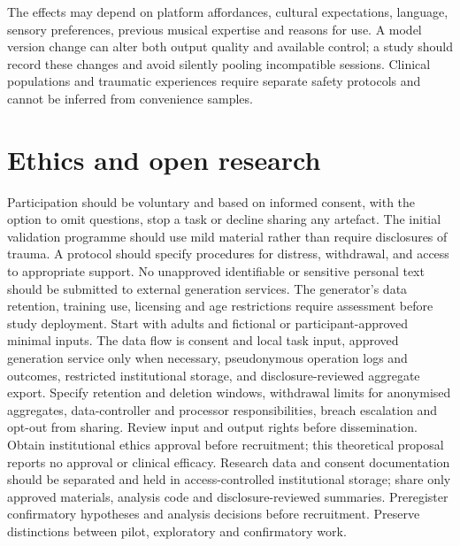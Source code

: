 \documentclass[11pt,a4paper]{article}
\begin{document}
The effects may depend on platform affordances, cultural expectations, language, sensory preferences, previous musical expertise and reasons for use. A model version change can alter both output quality and available control; a study should record these changes and avoid silently pooling incompatible sessions. Clinical populations and traumatic experiences require separate safety protocols and cannot be inferred from convenience samples.

\section{Ethics and open research}
Participation should be voluntary and based on informed consent, with the option to omit questions, stop a task or decline sharing any artefact. The initial validation programme should use mild material rather than require disclosures of trauma. A protocol should specify procedures for distress, withdrawal, and access to appropriate support. No unapproved identifiable or sensitive personal text should be submitted to external generation services. The generator's data retention, training use, licensing and age restrictions require assessment before study deployment. Start with adults and fictional or participant-approved minimal inputs. The data flow is consent and local task input, approved generation service only when necessary, pseudonymous operation logs and outcomes, restricted institutional storage, and disclosure-reviewed aggregate export. Specify retention and deletion windows, withdrawal limits for anonymised aggregates, data-controller and processor responsibilities, breach escalation and opt-out from sharing. Review input and output rights before dissemination. Obtain institutional ethics approval before recruitment; this theoretical proposal reports no approval or clinical efficacy. Research data and consent documentation should be separated and held in access-controlled institutional storage; share only approved materials, analysis code and disclosure-reviewed summaries. Preregister confirmatory hypotheses and analysis decisions before recruitment. Preserve distinctions between pilot, exploratory and confirmatory work.
\end{document}
